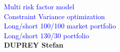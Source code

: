 \documentclass[a4, 14pts]{seminar}
\newcommand\eadsccr{\textsf{}\xspace}
\begin{document}
\begin{slide}
\thispagestyle{plain}
\begin{center}
\textcolor{blue}{\huge  Multi risk factor model}\\
\textcolor{blue}{\huge  Constraint Variance optimization}\\
\textcolor{blue}{\huge  Long/short 100/100 market portfolio}\\
\textcolor{blue}{\huge  Long/short 130/30 portfolio}\\
\vspace{0.25 cm}
\textbf{DUPREY Stefan}\\
\small{\textbf{}\\ 

	    }
\end{center}
\end{slide}
\end{document}
